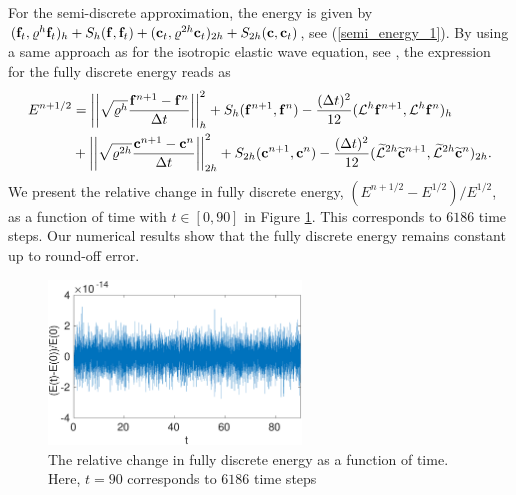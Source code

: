 For the semi-discrete approximation, the energy is given by $({\bf f}_t,\mathcal{\varrho}^h{\bf f}_t)_h + S_h({\bf f},{\bf f}_t) + ({\bf c}_t,\mathcal{\varrho}^{2h}{\bf c}_t)_{2h} + S_{2h}({\bf c},{\bf c}_t)$, see (\ref{semi_energy_1}). By using a same approach as for the isotropic elastic wave equation, see \cite{petersson2015wave,sjogreen2012fourth},  the expression for the fully discrete energy reads as
\begin{align*}
E^{n+1/2} &= \left|\left|\sqrt{\mathcal{\varrho}^h}\frac{{\bf f}^{n+1}-{\bf f}^n}{\Delta t}\right|\right|_h^2 + S_h({\bf f}^{n+1},{\bf f}^n) - \frac{(\Delta t)^2}{12}(\mathcal{L}^h{\bf f}^{n+1},\mathcal{L}^h{\bf f}^n)_h\\
&+ \left|\left|\sqrt{\mathcal{\varrho}^{2h}}\frac{{\bf c}^{n+1}-{\bf c}^n}{\Delta t}\right|\right|_{2h}^2 + S_{2h}({\bf c}^{n+1},{\bf c}^n) - \frac{(\Delta t)^2}{12}(\widetilde{\mathcal{L}}^{2h}\widetilde{\bf c}^{n+1},\widetilde{\mathcal{L}}^{2h}\widetilde{\bf c}^n)_{2h}.
\end{align*}
We present the relative change in fully discrete energy, $(E^{n+1/2}-E^{1/2})/E^{1/2}$, as a function of time with $t\in[0,90]$ in Figure \ref{discrete_energy}. This corresponds to $6186$ time steps. Our numerical results show that the fully discrete energy remains constant up to round-off error.
\begin{figure}[htbp]
	\centering
	\includegraphics[width=0.6\textwidth,trim={0cm 0cm 0cm 0cm}, clip]{discrete_energy.eps}
	\caption{The relative change in fully discrete energy as a function of time. Here, $t = 90$ corresponds to $6186$ time steps}\label{discrete_energy}
\end{figure}


